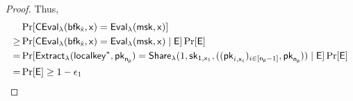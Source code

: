 \begin{proof}
Thus,
\[\begin{split}
	&\Pr[\mathsf{CEval}_{\lambda}(\mathsf{bfk}_{\hat{\mathsf{x}}}, \mathsf{x}) = \mathsf{Eval}_{\lambda}(\mathsf{msk}, \mathsf{x})]\\
	\geq&\Pr[\mathsf{CEval}_{\lambda}(\mathsf{bfk}_{\hat{\mathsf{x}}}, \mathsf{x}) = \mathsf{Eval}_{\lambda}(\mathsf{msk}, \mathsf{x}) \mid \mathsf{E}]\Pr[\mathsf{E}]\\
	=&\Pr[\mathsf{Extract}_{\lambda}(\mathsf{localkey}^*, \mathsf{pk}_{\mathsf{n_p}}) = {\mathsf{Share}}_\lambda(1, \mathsf{sk}_{1,\mathsf{x}_1}, ((\mathsf{pk}_{i,\mathsf{x}_i})_{i \in [\mathsf{n_p}-1]}, \mathsf{pk}_{\mathsf{n_p}})) \mid \mathsf{E}]\Pr[\mathsf{E}]\\
	=&\Pr[\mathsf{E}] \geq 1-\epsilon_1
\end{split}\]
	

\end{proof}

